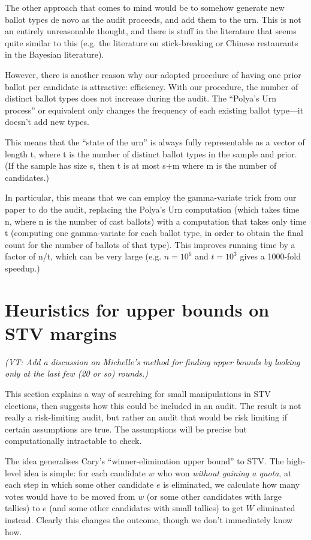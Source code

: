 \documentclass[10pt,a4paper]{article}
\newcommand{\VTNote}[1]{{\it(VT: #1)}}
\begin{document}
The other approach that comes to mind would be to somehow generate
new ballot types de novo as the audit proceeds, and add them to
the urn.  This is not an entirely unreasonable thought, and there
is stuff in the literature that seems quite similar to this (e.g. the
literature on stick-breaking or Chinese restaurants in the Bayesian
literature).

However, there is another reason why our adopted procedure 
of having one prior ballot per candidate is attractive: efficiency.
With our procedure, the number of distinct ballot types does
not increase during the audit.  The ``Polya's Urn process'' or
equivalent only changes the frequency of each existing ballot
type---it doesn't add new types.

This means that the ``state of the urn'' is always fully representable
as a vector of length t, where t is the number of distinct ballot
types in the sample and prior.  (If the sample has size s, then t is at most s+m
where m is the number of candidates.)

In particular, this means that we can employ the gamma-variate
trick from our paper to do the audit, replacing the Polya's Urn
computation (which takes time n, where n is the number of cast
ballots) with a computation that takes only time t (computing
one gamma-variate for each ballot type, in order to obtain the
final count for the number of ballots of that type).  This improves
running time by a factor of n/t, which can be very large (e.g.
$n=10^6$ and $t=10^3$ gives a 1000-fold speedup.)




\section{Heuristics for upper bounds on STV margins}  \label{sec:winnerElimination}
\VTNote{Add a discussion on Michelle's method for finding upper bounds by looking only at the last few (20 or so) rounds.}

This section explains a way of searching for small manipulations in STV elections, then suggests how this could be included in an audit.  The result is not really a risk-limiting audit, but rather an audit that would be risk limiting if certain assumptions are true.  The assumptions will be precise but computationally intractable to check. 

The idea generalises Cary's ``winner-elimination upper bound'' to STV.  The high-level idea is simple: for each candidate $w$ who won \emph{without gaining a quota}, at each step in which some other candidate $e$ is eliminated, we calculate how many votes would have to be moved from $w$ (or some other candidates with large tallies) to $e$ (and some other candidates with small tallies) to get $W$ eliminated instead.   Clearly this changes the outcome, though we don't immediately know how.
\end{document}
